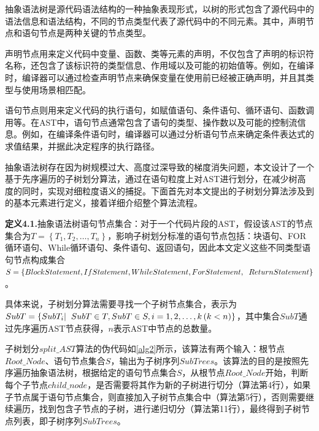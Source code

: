 抽象语法树是源代码语法结构的一种抽象表现形式，以树的形式包含了源代码中的语法信息和语法结构，不同的节点类型代表了源代码中的不同元素。其中，声明节点和语句节点是两种关键的节点类型。

声明节点用来定义代码中变量、函数、类等元素的声明，不仅包含了声明的标识符名称，还包含了该标识符的类型信息、作用域以及可能的初始值等。例如，在编译时，编译器可以通过检查声明节点来确保变量在使用前已经被正确声明，并且其类型与使用场景相匹配。

语句节点则用来定义代码的执行语句，如赋值语句、条件语句、循环语句、函数调用等。在AST中，语句节点通常包含了语句的类型、操作数以及可能的控制流信息。例如，在编译条件语句时，编译器可以通过分析语句节点来确定条件表达式的求值结果，并据此决定程序的执行路径。

抽象语法树存在因为树规模过大、高度过深导致的梯度消失问题，本文设计了一个基于先序遍历的子树划分算法，通过在语句粒度上对AST进行划分，在减少树高度的同时，实现对细粒度语义的捕捉。下面首先对本文提出的子树划分算法涉及到的基本元素进行定义，接着详细介绍整个算法流程。

\textbf{定义4.1.}抽象语法树语句节点集合：对于一个代码片段的AST，假设该AST的节点集合为$T = \left\{T_1,T_2,\ldots,T_n\right\}$，影响子树划分标准的语句节点包括：块语句、FOR循环语句、While循环语句、条件语句、返回语句，因此本文定义这些不同类型语句节点构成集合$S = \left\{BlockStatement,IfStatement,WhileStatement,ForStatement,\notag \right.\\\left.ReturnStatement\right\}$。

具体来说，子树划分算法需要寻找一个子树节点集合，表示为$SubT = \left\{SubT_i |\notag \right.\\\left. SubT \in T, SubT \in S,i=1,2,\ldots,k\left(k<n\right)\right\}$，其中集合$SubT$通过先序遍历AST节点获得，$n$表示AST中节点的总数量。

子树划分$split\_AST$算法的伪代码如\ref{alg2}所示，该算法有两个输入：根节点$Root\_Node$、语句节点集合$S$，输出为子树序列$SubTrees$。该算法的目的是按照先序遍历抽象语法树，根据给定的语句节点集合$S$，从根节点$Root\_Node$开始，判断每个子节点$child\_node$，是否需要将其作为新的子树进行切分（算法第4行），如果子节点属于语句节点集合，则直接加入子树节点集合中（算法第5行），否则需要继续遍历，找到包含子节点的子树，进行递归切分（算法第11行），最终得到子树节点列表，即子树序列$SubTrees$。

